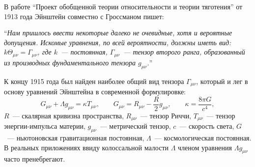 \documentclass[\docroot/reports/draft/report.tex]{subfiles}
\begin{document}
    В работе \enquote{Проект обобщенной теории относительности и теории тяготения} \cite{einstein_grossman_grav_waves} от 1913 года Эйнштейн совместно с Гроссманом пишет:

    \enquote{\textit{Нам пришлось ввести некоторые далеко не очевидные, хотя и вероятные допущения. Искомые уравнения, по всей вероятности, должны иметь вид: $k \Theta_{\mu\nu} = \Gamma_{\mu\nu}$, где $k$~--- постоянная, $\Gamma_{\mu\nu}$~--- тензор второго ранга, образованный из производных фундаментального тензора $g_{\mu\nu}$.}}

    К концу 1915 года был найден наиболее общий вид тензора $\Gamma_{\mu\nu}$, который и лег в основу уравнений Эйнштейна в современной формулировке:
    \begin{equation}\label{eq:einstein}
        G_{\mu\nu} + \Lambda g_{\mu\nu} = \kappa T_{\mu\nu}, \qquad
        G_{\mu\nu} = R_{\mu\nu} - \frac{R}{2} g_{\mu\nu} , \qquad
        \kappa = \frac{8 \pi G}{c^4} ,
    \end{equation}
    $R$~--- скалярная кривизна пространства, $R_{\mu\nu}$~--- тензор Риччи, $T_{\mu\nu}$~--- тензор энергии-импульса материи, $g_{\mu\nu}$~--- метрический тензор, $c$~--- скорость света, $G$~--- ньютоновская гравитационная постоянная, $\Lambda$~--- космологическая постоянная. В реальных приложениях ввиду колоссальной малости $\Lambda$ членом уравнения $\Lambda g_{\mu\nu}$ часто пренебрегают.
\end{document}
